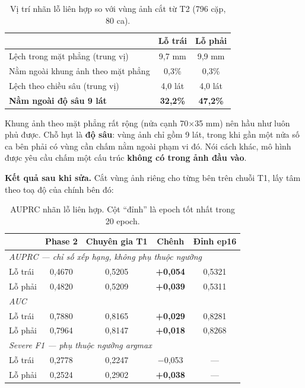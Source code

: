 \documentclass[11pt,a4paper]{article}
\newcommand{\up}[1]{\textcolor{teal!70!black}{\textbf{#1}}}
\newcommand{\down}[1]{\textcolor{red!65!black}{#1}}
\begin{document}
\begin{table}[htbp]
\centering\small
\caption{Vị trí nhãn lỗ liên hợp so với vùng ảnh cắt từ T2 (796 cặp, 80 ca).}
\label{tab:geo}
\begin{tabular}{lcc}
\toprule
 & \textbf{Lỗ trái} & \textbf{Lỗ phải} \\
\midrule
Lệch trong mặt phẳng (trung vị)      & 9{,}7 mm & 9{,}9 mm \\
Nằm ngoài khung ảnh theo mặt phẳng   & 0{,}3\% & 0{,}3\% \\
Lệch theo chiều sâu (trung vị)       & 4{,}0 lát & 4{,}0 lát \\
\textbf{Nằm ngoài độ sâu 9 lát}      & \down{\textbf{32{,}2\%}} & \down{\textbf{47{,}2\%}} \\
\bottomrule
\end{tabular}
\end{table}

Khung ảnh theo mặt phẳng rất rộng (nửa cạnh 70$\times$35 mm) nên hầu như luôn phủ được. Chỗ hụt
là \textbf{độ sâu}: vùng ảnh chỉ gồm 9 lát, trong khi gần một nửa số ca bên phải có vùng cần chấm
nằm ngoài phạm vi đó. Nói cách khác, mô hình được yêu cầu chấm một cấu trúc \textbf{không có trong
ảnh đầu vào}.

\textbf{Kết quả sau khi sửa.} Cắt vùng ảnh riêng cho từng bên trên chuỗi T1, lấy tâm theo toạ độ
của chính bên đó:

\begin{table}[htbp]
\centering\small
\caption{AUPRC nhãn lỗ liên hợp. Cột ``đỉnh'' là epoch tốt nhất trong 20 epoch.}
\label{tab:t1}
\begin{tabular}{lcccc}
\toprule
 & \textbf{Phase 2} & \textbf{Chuyên gia T1} & \textbf{Chênh} & \textbf{Đỉnh ep16} \\
\midrule
\multicolumn{5}{l}{\textit{AUPRC --- chỉ số xếp hạng, không phụ thuộc ngưỡng}} \\
\quad Lỗ trái  & 0{,}4670 & 0{,}5205 & \up{+0{,}054} & 0{,}5321 \\
\quad Lỗ phải  & 0{,}4820 & 0{,}5209 & \up{+0{,}039} & 0{,}5311 \\
\midrule
\multicolumn{5}{l}{\textit{AUC}} \\
\quad Lỗ trái  & 0{,}7880 & 0{,}8165 & \up{+0{,}029} & 0{,}8281 \\
\quad Lỗ phải  & 0{,}7964 & 0{,}8147 & \up{+0{,}018} & 0{,}8268 \\
\midrule
\multicolumn{5}{l}{\textit{Severe F1 --- phụ thuộc ngưỡng argmax}} \\
\quad Lỗ trái  & 0{,}2778 & 0{,}2247 & \down{$-$0{,}053} & --- \\
\quad Lỗ phải  & 0{,}2524 & 0{,}2902 & \up{+0{,}038} & --- \\
\bottomrule
\end{tabular}
\end{table}
\end{document}
